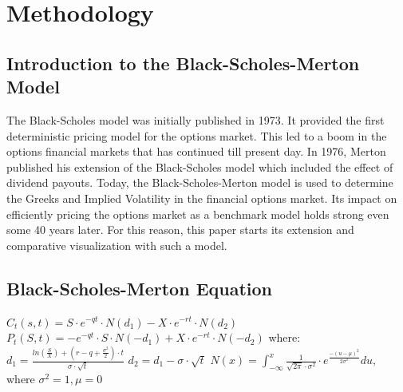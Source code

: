 \documentclass{article}
\begin{document}
\section{Methodology}

\subsection{Introduction to the Black-Scholes-Merton Model}
\begin{flushleft}
The Black-Scholes model was initially published in 1973. It provided the first deterministic pricing model for the options market. This led to a boom in the options financial markets that has continued till present day. In 1976, Merton published his extension of the Black-Scholes model which included the effect of dividend payouts. Today, the Black-Scholes-Merton model is used to determine the Greeks and Implied Volatility in the financial options market. Its impact on efficiently pricing the options market as a benchmark model holds strong even some 40 years later. For this reason, this paper starts its extension and comparative visualization with such a model. 
\end{flushleft}
\subsection{Black-Scholes-Merton Equation}
\begin{flushleft}
$C_t(s,t) = S \cdot e^{-qt}  \cdot N (d_1) - X\cdot e^{-rt} \cdot N(d_2)$
\newline\newline
$P_t(S,t) = -e^{-qt}  \cdot  S \cdot N (-d_1) + X\cdot e^{-rt} \cdot N(-d_2)$
\newline\newline
where: 
\newline\newline
$d_1 = \frac {ln(\frac{S}{X}) + (r-q+ \frac{\sigma^2}{2}) \cdot t}{\sigma \cdot \sqrt {t}}$
\newline\newline
$d_2 = d_1 - \sigma \cdot \sqrt{t}$
\newline\newline
$N(x) = \int_{-\infty}^{x} {\frac {1}{\sqrt{2\pi}\cdot \sigma^2}\cdot e ^{\frac{-(u-\mu)^2}{2\sigma^2}} du},$
where $\sigma^2 = 1, \mu = 0$
\end{flushleft}
\end{document}
